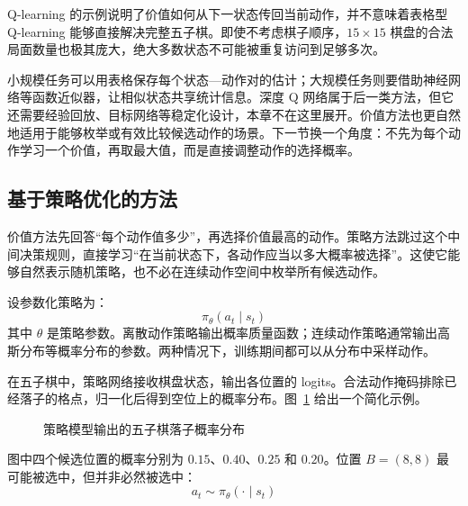 \begin{importantnote}
Q-learning 的示例说明了价值如何从下一状态传回当前动作，并不意味着表格型 Q-learning 能够直接解决完整五子棋。即使不考虑棋子顺序，$15\times15$ 棋盘的合法局面数量也极其庞大，绝大多数状态不可能被重复访问到足够多次。
\end{importantnote}

小规模任务可以用表格保存每个状态—动作对的估计；大规模任务则要借助神经网络等函数近似器，让相似状态共享统计信息。深度 Q 网络属于后一类方法，但它还需要经验回放、目标网络等稳定化设计，本章不在这里展开。价值方法也更自然地适用于能够枚举或有效比较候选动作的场景。下一节换一个角度：不先为每个动作学习一个价值，再取最大值，而是直接调整动作的选择概率。

\subsection{基于策略优化的方法}

价值方法先回答“每个动作值多少”，再选择价值最高的动作。策略方法跳过这个中间决策规则，直接学习“在当前状态下，各动作应当以多大概率被选择”。这使它能够自然表示随机策略，也不必在连续动作空间中枚举所有候选动作。

设参数化策略为：
\begin{equation}
\pi_{\theta}(a_t\mid s_t)
\end{equation}
其中 $\theta$ 是策略参数。离散动作策略输出概率质量函数；连续动作策略通常输出高斯分布等概率分布的参数。两种情况下，训练期间都可以从分布中采样动作。

在五子棋中，策略网络接收棋盘状态，输出各位置的 logits。合法动作掩码排除已经落子的格点，归一化后得到空位上的概率分布。图~\ref{fig:gobang_policy_distribution} 给出一个简化示例。

\begin{figure}[htbp]
  \centering
  \caption{策略模型输出的五子棋落子概率分布}
  \label{fig:gobang_policy_distribution}
\end{figure}

图中四个候选位置的概率分别为 $0.15$、$0.40$、$0.25$ 和 $0.20$。位置 $B=(8,8)$ 最可能被选中，但并非必然被选中：
\begin{equation}
a_t
\sim
\pi_{\theta}(\cdot\mid s_t)
\end{equation}

